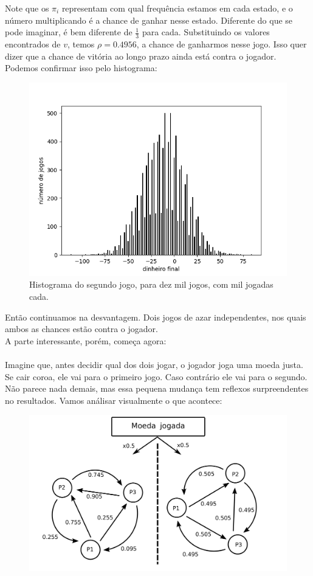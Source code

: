 \documentclass[12pt]{article}
\begin{document}
Note que os $\pi_i$ representam com qual frequência estamos em cada estado, e o número multiplicando é a chance de ganhar nesse estado. Diferente do que se pode imaginar, é bem diferente de $\frac{1}{3}$ para cada.
Substituindo os valores encontrados de $v$, temos $\rho = 0.4956$, a chance de ganharmos nesse jogo. Isso quer dizer que a chance de vitória ao longo prazo ainda está contra o jogador.\\
Podemos confirmar isso pelo histograma:

\begin{figure}[H]
\centering
\includegraphics[scale=0.8]{graph8.png}
\caption{Histograma do segundo jogo, para dez mil jogos, com mil jogadas cada.}
\end{figure}

Então continuamos na desvantagem. Dois jogos de azar independentes, nos quais ambos as chances estão contra o jogador.\\
A parte interessante, porém, começa agora:\\
\\
Imagine que, antes decidir qual dos dois jogar, o jogador joga uma moeda justa. Se cair coroa, ele vai para o primeiro jogo. Caso contrário ele vai para o segundo.\\
Não parece nada demais, mas essa pequena mudança tem reflexos surpreendentes no resultados. Vamos análisar visualmente o que acontece:

\begin{figure}[H]
\centering
\includegraphics[scale=0.5]{fig4.png}
\end{figure}
\end{document}
